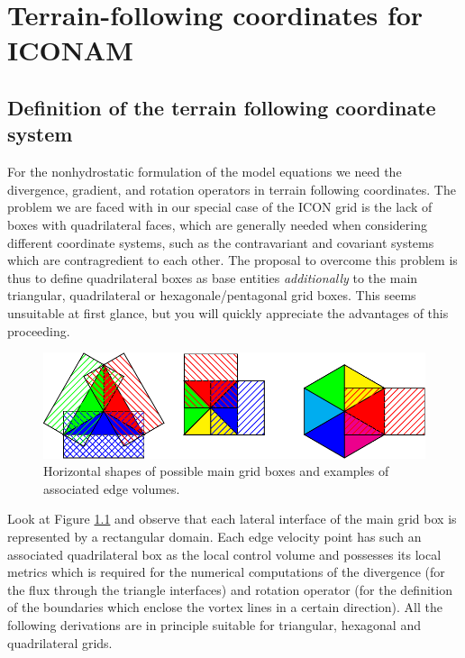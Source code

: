 %

\chapter{Terrain-following coordinates for ICONAM}

\section{Definition of the terrain following coordinate system}

For the nonhydrostatic formulation of the model equations we need the
divergence, gradient, and rotation operators in terrain following coordinates.
The problem we are faced with in our special case of the ICON grid is the lack
of boxes with quadrilateral faces, which are generally needed when considering
different coordinate systems, such as the contravariant and covariant systems
which are contragredient to each other. The proposal to overcome this problem
is thus to define quadrilateral boxes as base entities \textit{additionally} to the
main triangular, quadrilateral or hexagonale/pentagonal grid boxes. This seems
unsuitable at first glance, but you will quickly appreciate the advantages of
this proceeding.

\begin{figure}[h]
%
\begin{center}
\includegraphics{fig_main_boxes.pdf}
\end{center}
\caption{Horizontal shapes of possible main grid boxes and examples of associated edge volumes.}
\label{tri_cont_vol}
\end{figure}

Look at Figure \ref{tri_cont_vol} and observe that each lateral interface
of the main grid box is represented by a rectangular domain. Each edge
velocity point has such an associated quadrilateral box as the local control
volume and possesses its local metrics which is required for the numerical computations
of the divergence (for the flux through the triangle interfaces) and
rotation operator (for the definition of the boundaries which enclose the
vortex lines in a certain direction). All the following derivations are in principle
suitable for triangular, hexagonal and quadrilateral grids.

